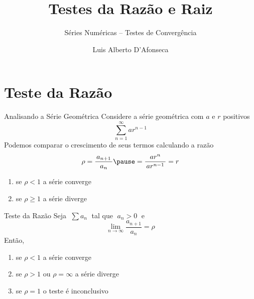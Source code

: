 
\usepackage{apresentacao}
\usepackage{tabto}

\makeatletter
\graphicspath  {{./figs/}}
\makeatother

\newcommand{\mytitle}   {Testes da Razão e Raiz}
\newcommand{\mysubtitle}{Séries Numéricas -- Testes de Convergência}
\title   {\mytitle}
\subtitle{\mysubtitle}
\author  {\large Luis Alberto D'Afonseca}
\date    {}



\begin{frame}
    \titlepage
\end{frame}

\section{Teste da Razão}

\begin{frame}{Analisando a Série Geométrica}
	Considere a série geométrica com $a$ e $r$ positivos
	\[ \sum_{n=1}^{\infty} ar^{n-1} \]
	\pause
	Podemos comparar o crescimento de seus termos calculando a razão
	\[ \rho = \frac{\,a_{n+1}\,}{a_n} \pause = \frac{ar^n}{\,ar^{n-1}\,} = r \]
	\pause
	\vspace{-0.5\baselineskip}
	\begin{enumerate}
		\item se $\rho<1$     \tabto{17mm} a série converge
		\item se $\rho\geq 1$ \tabto{17mm} a série diverge
	\end{enumerate}
\end{frame}

\begin{frame}{Teste da Razão}
	Seja $\;\sum a_n\;$ tal que $\;a_n>0\;$ \pause e
	\[ \lim_{n\to\infty}\frac{a_{n+1}}{a_n} = \rho \]
	\pause
	Então,
	\begin{enumerate}[<+->]
		\item se $\rho<1$                  \tabto{37mm} a série converge
		\item se $\rho>1$ ou $\rho=\infty$ \tabto{37mm} a série diverge
		\item se $\rho=1$                  \tabto{37mm} o teste é inconclusivo
	\end{enumerate}
\end{frame}

